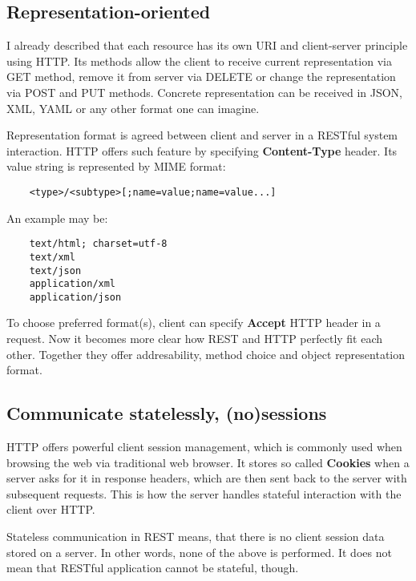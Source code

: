 	\subsection{Representation-oriented}
	
	I already described that each resource has its own URI and client-server principle using HTTP. Its methods allow the
	client to receive current representation via GET method, remove it from server via DELETE or change the representation
	via POST and PUT methods. Concrete representation can be received in JSON, XML, YAML or any other format one can
	imagine.
	
	Representation format is agreed between client and server in a RESTful system interaction. HTTP offers such feature
	by specifying \textbf{Content-Type} header. Its value string is represented by \gls{MIME} format:
	
	\begin{verbatim}
	<type>/<subtype>[;name=value;name=value...]
	\end{verbatim}
	
	An example may be:
	
	\begin{verbatim}
	text/html; charset=utf-8
	text/xml
	text/json
	application/xml
	application/json
	\end{verbatim}
	
	To choose preferred format(s), client can specify \textbf{Accept} HTTP header in a request. Now it becomes more clear
	how REST and HTTP perfectly fit each other. Together they offer addresability, method choice and object representation
	format.
	
	\subsection{Communicate statelessly, (no)sessions}
	
	HTTP offers powerful client session management, which is commonly used when browsing the web via traditional web
	browser. It stores so called \textbf{Cookies} when a server asks for it in response headers, which are then sent back
	to the server with subsequent requests. This is how the server handles stateful interaction with the client over HTTP.
	
	Stateless communication in REST means, that there is no client session data stored on a server. In other words, none of
	the above is performed. It does not mean that RESTful application cannot be stateful, though.
	
